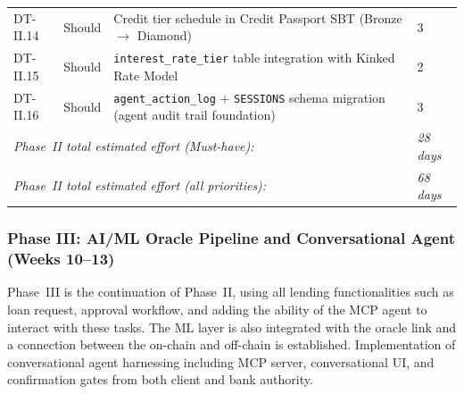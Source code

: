 \begin{table}[H]
\begin{tabular}{p{1.8cm}p{1.8cm}p{7.5cm}p{1.5cm}}
DT-II.14 & Should & Credit tier schedule in Credit Passport SBT (Bronze $\to$ Diamond) & 3 \\
DT-II.15 & Should & \texttt{interest\_rate\_tier} table integration with Kinked Rate Model & 2 \\
DT-II.16 & Should & \texttt{agent\_action\_log} + \texttt{SESSIONS} schema migration (agent audit trail foundation) & 3 \\
\multicolumn{3}{l}{\textit{Phase~II total estimated effort (Must-have):}} & \textit{28 days} \\
\multicolumn{3}{l}{\textit{Phase~II total estimated effort (all priorities):}} & \textit{68 days} \\
\bottomrule
\end{tabular}
\end{table}


\subsubsection{Phase III: AI/ML Oracle Pipeline and Conversational Agent (Weeks 10--13)}

Phase~III is the continuation of Phase~II, using all lending functionalities such as loan request, approval workflow, and adding the ability of the MCP agent to interact with these tasks. The ML layer is also integrated with the oracle link and a connection between the on-chain and off-chain is established. Implementation of conversational agent harnessing including MCP server, conversational UI, and confirmation gates from both client and bank authority.

